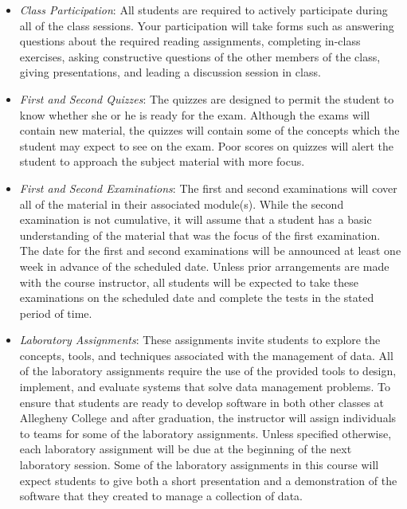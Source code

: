 \documentclass[11pt]{article} %
\begin{document}
\begin{itemize}


  \item {\em Class Participation}: All students are required to actively participate during all of the class sessions. Your participation will take forms such as answering questions about the required reading assignments, completing in-class exercises, asking constructive questions of the other members of the class, giving presentations, and leading a discussion session in class.%


  \item {\em First and Second Quizzes}: The quizzes are designed to permit the student to know whether she or he is ready for the exam. Although the exams will contain new material, the quizzes will contain some of the concepts which the student may expect to see on the exam. Poor scores on quizzes will alert the student to approach the subject material with more focus.
	
  \item {\em First and Second Examinations}: The first and second examinations will cover all of the material in their associated module(s). While the second examination is not cumulative, it will assume that a student has a basic understanding of the material that was the focus of the first examination. The date for the first and second examinations will be announced at least one week in advance of the scheduled date. Unless prior arrangements are made with the course instructor, all students will be expected to take these examinations on the scheduled date and complete the tests in the stated period of time.



  \item {\em Laboratory Assignments}: These assignments invite students to explore the concepts, tools, and techniques associated with the management of data.  All of the laboratory assignments require the use of the provided tools to design, implement, and evaluate systems that solve data management problems.  To ensure that students are ready to develop software in both other classes at Allegheny College and after graduation, the instructor will assign individuals to teams for some of the laboratory assignments.  Unless specified otherwise, each laboratory assignment will be due at the beginning of the next laboratory session.  Some of the laboratory assignments in this course will expect students to give both a short presentation and a demonstration of the software that they created to manage a collection of data.  


\end{itemize}
\end{document}
